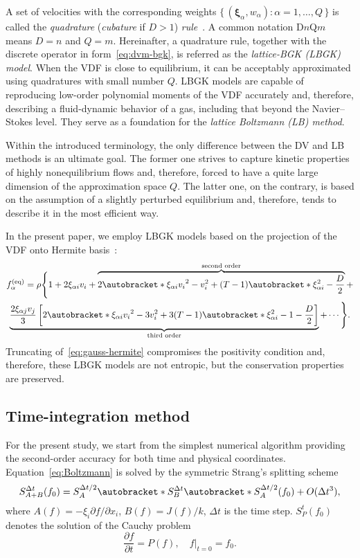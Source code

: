 \documentclass{article}
\newcommand{\pder}[2][]{\frac{\partial#1}{\partial#2}}
\newcommand{\Pder}[2][]{\partial#1/\partial#2}
\newcommand{\Set}[2]{\{\,{#1}:{#2}\,\}}
\newcommand{\OO}[1]{O(#1)}
\DeclarePairedDelimiter\autobracket()       %
\newcommand{\br}[1]{\autobracket*{#1}}
\newcommand{\bxi}{{\boldsymbol{\xi}}}
\newcommand{\bxia}{\bxi_\alpha}
\newcommand{\xiai}{\xi_{\alpha i}}
\newcommand{\xiaj}{\xi_{\alpha j}}
\newcommand{\equil}[1]{#1^\mathrm{(eq)}}
\begin{document}
A set of velocities with the corresponding weights \(\Set{(\bxia,w_\alpha)}{\alpha=1,\dots,Q}\)
is called the \emph{quadrature} (\emph{cubature} if \(D>1\)) \emph{rule}~\cite{Stroud1971}.
A common notation D\(n\)Q\(m\) means \(D=n\) and \(Q=m\).
Hereinafter, a quadrature rule, together with the discrete operator in form~\eqref{eq:dvm-bgk},
is referred as the \emph{lattice-BGK (LBGK) model}.
When the VDF is close to equilibrium, it can be acceptably approximated using quadratures with small number \(Q\).
LBGK models are capable of reproducing low-order polynomial moments of the VDF accurately and,
therefore, describing a fluid-dynamic behavior of a gas, including that beyond the Navier--Stokes level.
They serve as a foundation for the \emph{lattice Boltzmann (LB) method}.

Within the introduced terminology, the only difference between the DV and LB methods is an ultimate goal.
The former one strives to capture kinetic properties of highly nonequilibrium flows and, therefore,
forced to have a quite large dimension of the approximation space \(Q\).
The latter one, on the contrary, is based on the assumption of a slightly perturbed equilibrium and, therefore,
tends to describe it in the most efficient way.

In the present paper, we employ LBGK models based on the projection of the VDF onto Hermite basis~\cite{Shan2006}:
\begin{multline}\label{eq:gauss-hermite}
    \equil{f}_\alpha = \rho\Bigg\{ 1 + 2\xiai v_i + \overbrace{
        2\br{\xiai v_i}^2 - v_i^2 + (T-1)\br{\xiai^2 - \frac{D}2}
    }^\text{second order} + \\ \underbrace{
        \frac{2\xiaj v_j}3\left[ 2\br{\xiai v_i}^2 - 3v_i^2 + 3(T-1)\br{\xiai^2 - 1 - \frac{D}2}\right]
    }_\text{third order} + \cdots \Bigg\}.
\end{multline}
Truncating of~\eqref{eq:gauss-hermite} compromises the positivity condition and,
therefore, these LBGK models are not entropic, but the conservation properties are preserved.

\subsection{Time-integration method}\label{sec:splitting}

For the present study, we start from the simplest numerical algorithm providing the second-order accuracy
for both time and physical coordinates.
Equation~\eqref{eq:Boltzmann} is solved by the symmetric Strang's splitting scheme~\cite{Bobylev2001}
\begin{equation}\label{eq:Strang}
    S^{\Delta{t}}_{A+B}(f_0) = S^{\Delta{t}/2}_A \br{S^{\Delta{t}}_B \br{S^{\Delta{t}/2}_A(f_0)} } + \OO{\Delta{t}^3},
\end{equation}
where \(A(f) = -\xi_i\Pder[f]{x_i}\), \(B(f) = J(f)/k\), \(\Delta{t}\) is the time step.
\(S^t_P (f_0)\) denotes the solution of the Cauchy problem
\begin{equation}\label{eq:Cauchy}
    \pder[f]{t} = P(f), \quad f|_{t=0} = f_0.
\end{equation}
\end{document}
